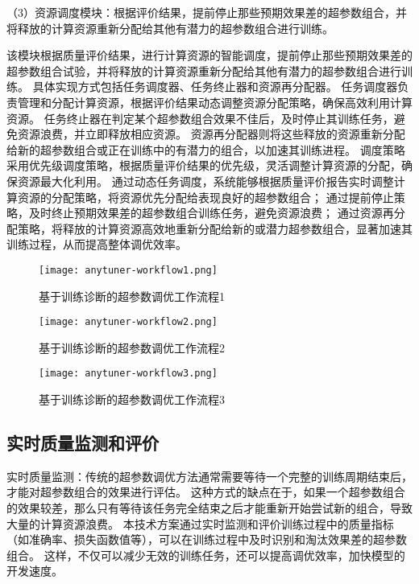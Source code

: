 （3）资源调度模块：根据评价结果，提前停止那些预期效果差的超参数组合，并将释放的计算资源重新分配给其他有潜力的超参数组合进行训练。

该模块根据质量评价结果，进行计算资源的智能调度，提前停止那些预期效果差的超参数组合试验，并将释放的计算资源重新分配给其他有潜力的超参数组合进行训练。
具体实现方式包括任务调度器、任务终止器和资源再分配器。
任务调度器负责管理和分配计算资源，根据评价结果动态调整资源分配策略，确保高效利用计算资源。
任务终止器在判定某个超参数组合效果不佳后，及时停止其训练任务，避免资源浪费，并立即释放相应资源。
资源再分配器则将这些释放的资源重新分配给新的超参数组合或正在训练中的有潜力的组合，以加速其训练进程。
调度策略采用优先级调度策略，根据质量评价结果的优先级，灵活调整计算资源的分配，确保资源最大化利用。
通过动态任务调度，系统能够根据质量评价报告实时调整计算资源的分配策略，将资源优先分配给表现良好的超参数组合；
通过提前停止策略，及时终止预期效果差的超参数组合训练任务，避免资源浪费；
通过资源再分配策略，将释放的计算资源高效地重新分配给新的或潜力超参数组合，显著加速其训练过程，从而提高整体调优效率。

\begin{figure}
  \centering
  \texttt{[image: anytuner-workflow1.png]}
  \caption{基于训练诊断的超参数调优工作流程1}
  \label{fig:anytunerworkflow1}
\end{figure}

\begin{figure}
  \centering
  \texttt{[image: anytuner-workflow2.png]}
  \caption{基于训练诊断的超参数调优工作流程2}
  \label{fig:anytunerworkflow2}
\end{figure}

\begin{figure}
  \centering
  \texttt{[image: anytuner-workflow3.png]}
  \caption{基于训练诊断的超参数调优工作流程3}
  \label{fig:anytunerworkflow3}
\end{figure}

\subsection{实时质量监测和评价}

实时质量监测：传统的超参数调优方法通常需要等待一个完整的训练周期结束后，才能对超参数组合的效果进行评估。
这种方式的缺点在于，如果一个超参数组合的效果较差，那么只有等待该任务完全结束之后才能重新开始尝试新的组合，导致大量的计算资源浪费。
本技术方案通过实时监测和评价训练过程中的质量指标（如准确率、损失函数值等），可以在训练过程中及时识别和淘汰效果差的超参数组合。
这样，不仅可以减少无效的训练任务，还可以提高调优效率，加快模型的开发速度。

